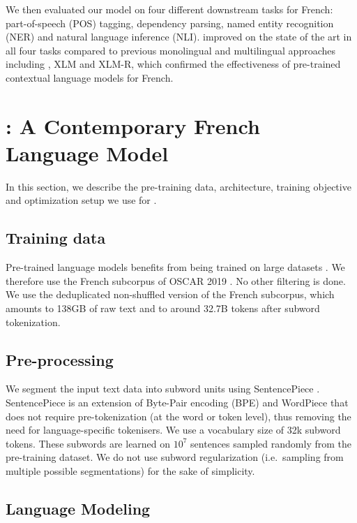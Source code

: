 We then evaluated our model on four different downstream tasks for French: part-of-speech (POS) tagging, dependency parsing, named entity recognition (NER) and natural language inference (NLI). \camembert improved on the state of the art in all four tasks compared to previous monolingual and multilingual approaches including \mbert, XLM and XLM-R, which confirmed the effectiveness of pre-trained contextual language models for French.

\section{\camembert: A Contemporary French Language Model}\label{sec:Camembert}
In this section, we describe the pre-training data, architecture, training objective and optimization setup we use for \camembert.

\subsection{Training data}
Pre-trained language models benefits from being trained on large datasets \citep{devlin-etal-2019-bert,liu-etal-2019-roberta,raffel-etal-2020-exploring}. We therefore use the French subcorpus of OSCAR 2019 \citep{ortiz-suarez-etal-2019-asynchronous,ortiz-suarez-etal-2020-monolingual}. No other filtering is done. We use the deduplicated non-shuffled version of the French subcorpus, which amounts to 138GB of raw text and to around 32.7B tokens after subword tokenization.

\subsection{Pre-processing}
We segment the input text data into subword units using SentencePiece \citep{kudo-richardson-2018-sentencepiece}. SentencePiece is an extension of Byte-Pair encoding (BPE) \citep{sennrich-etal-2016-neural} and WordPiece \citep{kudo-2018-subword} that does not require pre-tokenization (at the word or token level), thus removing the need for language-specific tokenisers. We use a vocabulary size of 32k subword tokens. These subwords are learned on $10^7$ sentences sampled randomly from the pre-training dataset.
We do not use subword regularization (i.e.~sampling from multiple possible segmentations) for the sake of simplicity.


\subsection{Language Modeling}

